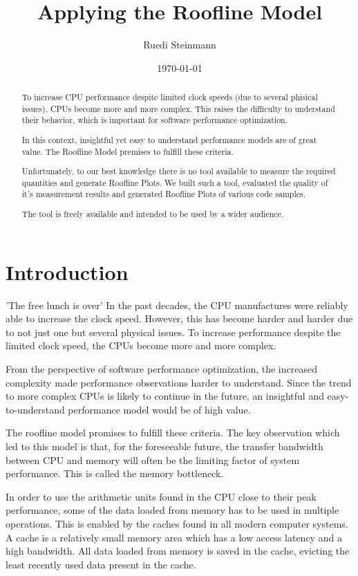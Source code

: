 \documentclass[a4paper,12pt]{article}
\title{Applying the Roofline Model}
\author{Ruedi Steinmann}
\date{\today}
\begin{document}
\maketitle

\begin{abstract}
To increase CPU performance despite limited clock speeds (due to several
phisical issues), CPUs become more and more complex. This raises the difficulty
to understand their behavior, which is important for software performance
optimization.

In this context, insightful yet easy to understand performance models are of
great value. The Roofline Model premises to fulfill these criteria.

Unfortunately, to our best knowledge there is no tool available to measure the
required quantities and generate Roofline Plots. We built such a tool, evaluated
the quality of it's measurement results and generated Roofline Plots of various
code samples.

The tool is freely available and intended to be used by a wider audience.
\end{abstract}

\tableofcontents

\section{Introduction}
'The free lunch is over' \cite{FreeLunchIsOver} In the past decades, the CPU
manufactures were reliably able to increase the clock speed. However, this has
become harder and harder due to not just one but several physical issues. To
increase performance despite the limited clock speed, the CPUs become more
and more complex.

From the perspective of software performance optimization, the increased
complexity made performance observations harder to understand. Since the trend
to more complex CPUs is likely to continue in the future, an insightful and
easy-to-understand performance model would be of high value.
 
The roofline model \cite{Roofline} promises to fulfill these criteria. The key
observation which led to this model is that, for the foreseeable future, the
transfer bandwidth between CPU and memory will often be the limiting factor of
system performance. This is called the memory bottleneck.

In order to use the arithmetic units found in the CPU close to their peak
performance, some of the data loaded from memory has to be used in multiple
operations. This is enabled by the caches found in all modern computer
systems. A cache is a relatively small memory area which has a low access
latency and a high bandwidth. All data loaded from memory is saved in the cache,
evicting the least recently used data present in the cache. 
\end{document}
